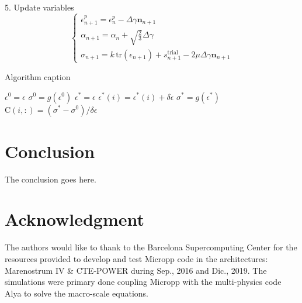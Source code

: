 \documentclass[conference, onecolumn]{IEEEtran}
\begin{document}
5. Update variables
\begin {equation}
\left\{
\begin{array}{ll}
\epsilon_{n+1}^{p} = \epsilon_{n}^{p} - \Delta \gamma  \mathbf{n}_{n+1} \\[5pt]
\alpha_{n+1} = \alpha_{n} + \sqrt{\frac{2}{3}} \Delta \gamma \\[5pt]
\sigma_{n+1} = k \, \text{tr} (\epsilon_{n+1}) + s_{n+1}^{\text{trial}} - 2 \mu \Delta \gamma \mathbf{n}_{n+1}
\end{array}
\right.
\end {equation}

\begin{algorithm}
\caption{Algorithm caption}
\label{alg:algorithm-label}
\begin{algorithmic}
 \STATE $ \epsilon^{0} = \epsilon $
 \STATE $ \sigma^{0} = g(\epsilon^{0})$
     \STATE $ \epsilon^{*} = \epsilon $
     \STATE $ \epsilon^{*}(i) = \epsilon^{*}(i) + \delta\epsilon $
     \STATE $ \sigma^{*} = g(\epsilon^{*})$
     \STATE $ \mathrm{C} (i, :) = ( \sigma^* - \sigma^0 ) / \delta\epsilon $
 \ENDFOR
\end{algorithmic}
\end{algorithm}







\section{Conclusion}
The conclusion goes here.

\section*{Acknowledgment}

The authors would like to thank to the Barcelona Supercomputing Center for the resources provided to develop and test Micropp code in the architectures: Marenostrum IV \& CTE-POWER during Sep., 2016 and Dic., 2019. The simulations were primary done coupling Micropp with the multi-physics code Alya to solve the macro-scale equations.

\begin{thebibliography}{1}





\end{thebibliography}
\end{document}
